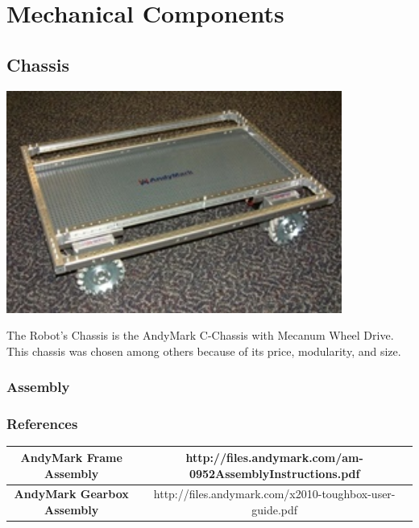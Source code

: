 \documentclass[letterpaper,12pt]{article}
\begin{document}
\section{Mechanical Components}
\subsection{Chassis}
\begin{center}
    \includegraphics[width=11cm]{pics/chassis/andymark_chassis.jpg}
\end{center}

The Robot's Chassis is the AndyMark C-Chassis with Mecanum Wheel Drive. This
chassis was chosen among others because of its price, modularity, and size.

\subsubsection{Assembly}
\subsubsection{References}

\begin{table}[h!]
  \begin{tabular}{| c | c |}
    \hline
    \textbf{AndyMark Frame Assembly} &  http://files.andymark.com/am-0952AssemblyInstructions.pdf\\
    \hline
    \textbf{AndyMark Gearbox Assembly} &  http://files.andymark.com/x2010-toughbox-user-guide.pdf\\
    \hline
  \end{tabular}
  \label{tab:fire_cmd_msg}
\end{table}
\end{document}
